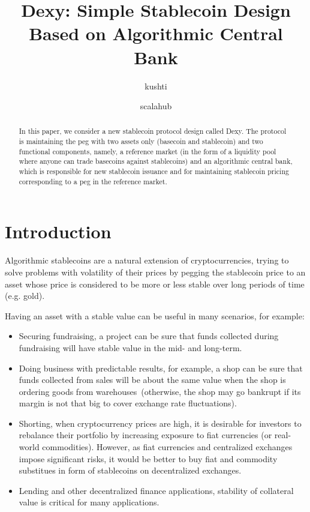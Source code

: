 \documentclass[a4paper,UKenglish,cleveref, autoref, thm-restate]{lipics-v2021}
\title{Dexy: Simple Stablecoin Design Based on Algorithmic Central Bank} %
\author{kushti}{Ergo Platform}{}{}{}%
\author{scalahub}{Ergo Platform}{}{}{}%
\begin{document}
\maketitle

\begin{abstract}
In this paper, we consider a new stablecoin protocol design called Dexy. The protocol is maintaining the peg with two assets only (basecoin and stablecoin) and two functional components, namely, a reference market (in the form of a liquidity pool where anyone can trade basecoins against stablecoins) and an algorithmic central bank, which is responsible for new stablecoin issuance and for maintaining stablecoin pricing corresponding to a peg in the reference market.
\end{abstract}

\section{Introduction}
\label{sec:introduction}

Algorithmic stablecoins are a natural extension of cryptocurrencies, trying to 
solve problems with volatility of their prices by pegging the stablecoin price to an
asset whose price is considered to be more or less stable over long periods of time (e.g. gold).

Having an asset with a stable value can be useful in many scenarios, for example:
\begin{itemize}
\item Securing fundraising, a project can be sure that funds collected during fundraising will have stable value in the mid- and long-term.
\item Doing business with predictable results, for example, a shop can be sure that funds collected from sales will be about the same value when the shop is ordering goods from warehouses~(otherwise, the shop may go bankrupt if its margin is not that big to cover exchange rate fluctuations). 
\item Shorting, when cryptocurrency prices are high, it is desirable for investors to rebalance their portfolio by increasing exposure to fiat currencies (or real-world commodities). However, as fiat currencies and centralized exchanges impose significant risks, it would be better to buy fiat and commodity substitues in form of stablecoins on decentralized exchanges.
\item Lending and other decentralized finance applications, stability of collateral value is critical for many applications.
\end{itemize}
\end{document}
